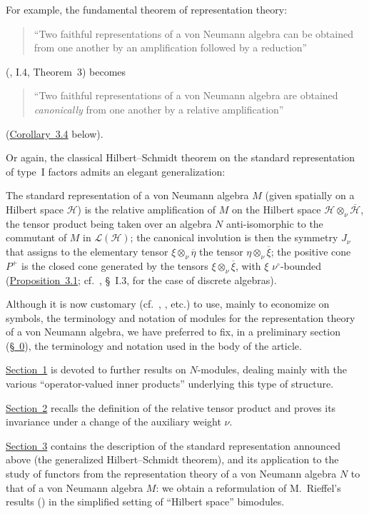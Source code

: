 \documentclass[fontsize=13pt,twoside,headings=small,bookmarkpackage=false]{scrartcl}
\newcommand{\Lop}{\mathcal L}
\newcommand{\HH}{\mathcal H}
\begin{document}
For example, the fundamental theorem of representation theory:
\begin{quote}
``Two faithful representations of a von Neumann algebra can be obtained from one another by an amplification followed by a reduction''
\end{quote}
(\cite{3}, I.4, Theorem~3) becomes
\begin{quote}
``Two faithful representations of a von Neumann algebra are obtained \emph{canonically} from one another by a relative amplification''
\end{quote}
(\hyperref[p:3.4]{Corollary~3.4} below).

Or again, the classical Hilbert--Schmidt theorem on the standard representation of type~I factors admits an elegant generalization:

The standard representation of a von Neumann algebra $M$ (given spatially on a Hilbert space $\HH$) is the relative amplification of $M$ on the Hilbert space $\HH\otimes_\nu\overline{\HH}$, the tensor product being taken over an algebra $N$ anti-isomorphic to the commutant of $M$ in $\Lop(\HH)$; the canonical involution is then the symmetry $J_\nu$ that assigns to the elementary tensor $\xi\otimes_\nu\overline\eta$ the tensor $\eta\otimes_\nu\overline\xi$; the positive cone $P^+$ is the closed cone generated by the tensors $\xi\otimes_\nu\overline\xi$, with $\xi$ $\nu^\circ$-bounded (\hyperref[p:3.1]{Proposition~3.1}; cf.\ \cite{8}, \S~I.3, for the case of discrete algebras).

Although it is now customary (cf.\ \cite{1}, \cite{7}, etc.) to use, mainly to economize on symbols, the terminology and notation of modules for the representation theory of a von Neumann algebra, we have preferred to fix, in a preliminary section (\hyperref[sec:0]{\S~0}), the terminology and notation used in the body of the article.

\hyperref[sec:1]{Section~1} is devoted to further results on $N$-modules, dealing mainly with the various ``operator-valued inner products'' underlying this type of structure.

\hyperref[sec:2]{Section~2} recalls the definition of the relative tensor product and proves its invariance under a change of the auxiliary weight $\nu$.

\hyperref[sec:3]{Section~3} contains the description of the standard representation announced above (the generalized Hilbert--Schmidt theorem), and its application to the study of functors from the representation theory of a von Neumann algebra $N$ to that of a von Neumann algebra $M$: we obtain a reformulation of M.~Rieffel's results (\cite{7}) in the simplified setting of ``Hilbert space'' bimodules.
\end{document}
